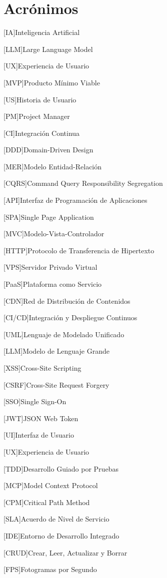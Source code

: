 \chapter*{Acrónimos}
%
%
\begin{acronym}

[IA]{Inteligencia Artificial}

[LLM]{Large Language Model}

[UX]{Experiencia de Usuario}

[MVP]{Producto Mínimo Viable}

[US]{Historia de Usuario}

[PM]{Project Manager}

[CI]{Integración Continua}

[DDD]{Domain-Driven Design}

[MER]{Modelo Entidad-Relación}

[CQRS]{Command Query Responsibility Segregation}

[API]{Interfaz de Programación de Aplicaciones}

[SPA]{Single Page Application}

[MVC]{Modelo-Vista-Controlador}

[HTTP]{Protocolo de Transferencia de Hipertexto}

[VPS]{Servidor Privado Virtual}

[PaaS]{Plataforma como Servicio}

[CDN]{Red de Distribución de Contenidos}

[CI/CD]{Integración y Despliegue Continuos}

[UML]{Lenguaje de Modelado Unificado}

[LLM]{Modelo de Lenguaje Grande}

[XSS]{Cross-Site Scripting}

[CSRF]{Cross-Site Request Forgery}

[SSO]{Single Sign-On}

[JWT]{JSON Web Token}

[UI]{Interfaz de Usuario}

[UX]{Experiencia de Usuario}

[TDD]{Desarrollo Guiado por Pruebas}

[MCP]{Model Context Protocol}

[CPM]{Critical Path Method}

[SLA]{Acuerdo de Nivel de Servicio}

[IDE]{Entorno de Desarrollo Integrado}

[CRUD]{Crear, Leer, Actualizar y Borrar}

[FPS]{Fotogramas por Segundo}

\end{acronym}
